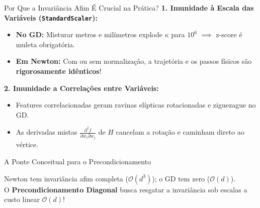 \documentclass[aspectratio=169, 10pt]{beamer}
\newenvironment{callouttip}[1][Dica]{%
  \begin{exampleblock}{#1}%
}{%
  \end{exampleblock}%
}
\begin{document}
\begin{frame}{Por Que a Invariância Afim É Crucial na Prática?}
  \textbf{1. Imunidade à Escala das Variáveis (\texttt{StandardScaler}):}
  \begin{itemize}
    \item \textbf{No GD:} Misturar metros e milímetros explode $\kappa$ para $10^6$ $\implies$ z-score é muleta obrigatória.
    \item \textbf{Em Newton:} Com ou sem normalização, a trajetória e os passos físicos são \textbf{rigorosamente idênticos}!
  \end{itemize}
  \vspace{0.2cm}
  \textbf{2. Imunidade a Correlações entre Variáveis:}
  \begin{itemize}
    \item Features correlacionadas geram ravinas elípticas rotacionadas e ziguezague no GD.
    \item As derivadas mistas $\frac{\partial^2 f}{\partial w_i \partial w_j}$ de $H$ cancelam a rotação e caminham direto ao vértice.
  \end{itemize}
  \vspace{0.3cm}
  \begin{callouttip}[A Ponte Conceitual para o Precondicionamento]
    Newton tem invariância afim completa ($\mathcal{O}(d^3)$); o GD tem zero ($\mathcal{O}(d)$).\\
    O \textbf{Precondicionamento Diagonal} busca resgatar a invariância sob escalas a custo linear $\mathcal{O}(d)$!
  \end{callouttip}
\end{frame}
\end{document}
